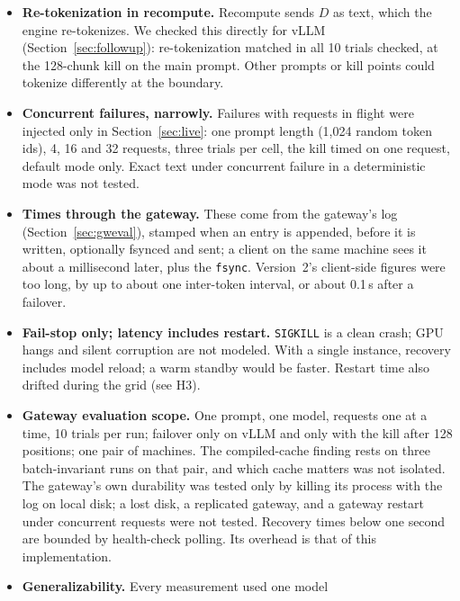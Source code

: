 \documentclass[10pt,twocolumn]{article}
\begin{document}
\begin{itemize}
    deterministic modes removed every contradiction and made recompute exact
    at temperature 0 supports, but does not prove, a numerical explanation
    \cite{he2025nondeterminism}; we did not identify which kernel differs.
    The ablations and follow-up runs covered only the 128-chunk kill point.
  \item \textbf{Re-tokenization in recompute.} Recompute sends $D$ as text,
    which the engine re-tokenizes. We checked this directly for vLLM
    (Section~\ref{sec:followup}): re-tokenization matched in all 10 trials
    checked, at the 128-chunk kill on the main prompt. Other prompts or
    kill points could tokenize differently at the boundary.
  \item \textbf{Concurrent failures, narrowly.} Failures with requests in
    flight were injected only in Section~\ref{sec:live}: one prompt length
    (1{,}024 random token ids), 4, 16 and 32 requests, three trials per cell,
    the kill timed on one request, default mode only. Exact text under
    concurrent failure in a deterministic mode was not tested.
  \item \textbf{Times through the gateway.} These come from the gateway's log
    (Section~\ref{sec:gweval}), stamped when an entry is appended, before it
    is written, optionally fsynced and sent; a client on the same machine
    sees it about a millisecond later, plus the \texttt{fsync}. Version~2's
    client-side figures were too long, by up to about one inter-token
    interval, or about 0.1\,s after a failover.
\item \textbf{Fail-stop only; latency includes restart.} \texttt{SIGKILL}
    is a clean crash; GPU hangs and silent corruption are not modeled. With
    a single instance, recovery includes model reload; a warm standby would
    be faster. Restart time also drifted during the grid (see H3).
\item \textbf{Gateway evaluation scope.} One prompt, one model, requests
    one at a time, 10 trials per run; failover only on vLLM and only with the
    kill after 128 positions; one pair of machines. The compiled-cache
    finding rests on three batch-invariant runs on that pair, and which
    cache matters was not isolated. The gateway's own durability was tested
    only by killing its process with the log on local disk; a lost disk, a
    replicated gateway, and a gateway restart under concurrent requests were not tested. Recovery
    times below one second are bounded by health-check polling. Its
    overhead is that of this implementation.
\item \textbf{Generalizability.} Every measurement used one model

\end{itemize}
\end{document}
